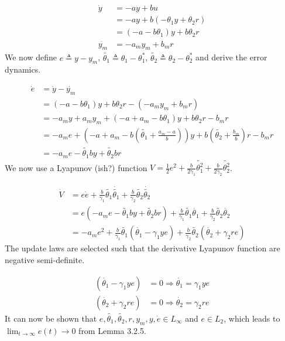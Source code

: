 \begin{equation}
\begin{split}
\dot{y} &= -ay +bu \\
& =-ay + b (-\theta_1 y + \theta_2 r) \\
& = (-a- b \theta_1) y + b \theta_2 r \\
\dot{y_m} &= -a_m y_m + b_m r
\end{split}
\end{equation}
We now define $e \triangleq y - y_m$, $\tilde{\theta_1}  \triangleq \theta_1 - \theta_1^*$, $\tilde{\theta_2}  \triangleq \theta_2 - \theta_2^*$ and derive the error dynamics.

\begin{equation}
\begin{split}
\dot{e} &= \dot{y}-\dot{y_m} \\
&= (-a- b \theta_1) y + b \theta_2 r - ( -a_m y_m + b_m r ) \\
&= -a_m y +  a_m y_m + (-a + a_m- b \theta_1) y + b \theta_2 r - b_m r \\
&= -a_m e + (-a + a_m- b (\tilde{\theta_1} +\frac{a_m-a}{b})) y + b (\tilde{\theta_2} + \frac{b_m}{b})r - b_m r \\
&= -a_m e - \tilde{\theta_1}b y + \tilde{\theta_2}b r
\end{split}
\end{equation}
We now use a Lyapunov (ish?) function $V = \frac{1}{2}e^2 + \frac{b}{2\gamma_1}\tilde{\theta_1^2} + \frac{b}{2\gamma_2}\tilde{\theta_2^2} $.

\begin{equation}
\begin{split}
\dot{V} &= e\dot{e} 	+ \frac{b}{\gamma_1}\tilde{\theta_1}\dot{\tilde{\theta_1}}
				+ \frac{b}{\gamma_2} \tilde{\theta_2}\dot{\tilde{\theta_2}} \\
&= 	e (-a_m e - \tilde{\theta_1}b y + \tilde{\theta_2}b r)
	+ \frac{b}{\gamma_1}\tilde{\theta_1}\dot{\theta_1}
	+ \frac{b}{\gamma_2}\tilde{\theta_2}\dot{\theta_2} \\
&= -a_m e^2 	+ \frac{b}{\gamma_1}\tilde{\theta_1}(\dot{\theta_1}  - \gamma_1 y e)
			+ \frac{b}{\gamma_2}\tilde{\theta_2}(\dot{\theta_2} + \gamma_2 r e )
\end{split}
\end{equation}
The update laws are selected such that the derivative Lyapunov function are negative semi-definite.

\begin{equation}
\begin{split}
(\dot{\theta_1}  - \gamma_1 y e) &= 0 \Rightarrow \dot{\theta_1} = \gamma_1 y e \\
(\dot{\theta_2} + \gamma_2 r e ) &= 0 \Rightarrow \dot{\theta_2} = \gamma_2 r e
\end{split}
\end{equation}
It can now be shown that $e,\tilde{\theta_1}, \tilde{\theta_2},r,y_m,y,\dot{e} \in L_\infty$ and $e \in L_2$, which leads to $\lim_{t \to \infty} e(t) \rightarrow 0$ from Lemma 3.2.5.

